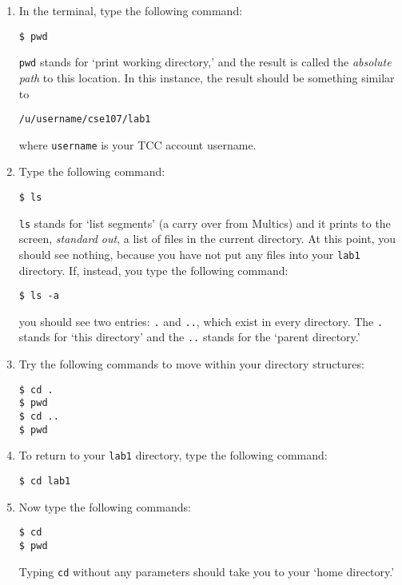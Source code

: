 \documentclass[12pt,hidelinks]{article}
\begin{document}
\begin{appendices}
\begin{enumerate}

\item In the terminal, type the following command:
\begin{lstlisting}[style=bash]
$ pwd
\end{lstlisting}

\texttt{pwd} stands for `print working directory,' and the result is called the \textit{absolute path} to this location. In this instance, the result should be something similar to

\begin{lstlisting}[style=bash]
/u/username/cse107/lab1
\end{lstlisting}

where \texttt{username} is your TCC account username.

\item Type the following command:
\begin{lstlisting}[style=bash]
$ ls
\end{lstlisting}

\texttt{ls} stands for `list segments' (a carry over from Multics) and it prints to the screen, \textit{standard out}, a list of files in the current directory. At this point, you should see nothing, because you have not put any files into your \texttt{lab1} directory. If, instead, you type the following command:
\begin{lstlisting}[style=bash]
$ ls -a
\end{lstlisting}

you should see two entries: \texttt{.} and \texttt{..}, which exist in every directory. The \texttt{.} stands for `this directory' and the \texttt{..} stands for the `parent directory.'

\item Try the following commands to move within your directory structures:
\begin{lstlisting}[style=bash]
$ cd .
$ pwd
$ cd ..
$ pwd
\end{lstlisting}

\item To return to your \texttt{lab1} directory, type the following command:
\begin{lstlisting}[style=bash]
$ cd lab1
\end{lstlisting}

\item Now type the following commands:
\begin{lstlisting}[style=bash]
$ cd
$ pwd
\end{lstlisting}
Typing \texttt{cd} without any parameters should take you to your `home directory.'


\end{enumerate}
\end{appendices}
\end{document}
